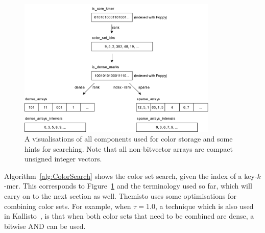 \begin{figure}[t]
  \centering
  \includegraphics[width=0.85\textwidth]{images/ColorComponents.png}
  \caption{A visualisations of all components used for color storage and some hints for searching. Note that all non-bitvector arrays are compact unsigned integer vectors.}\label{fig:ColorComponents}
\end{figure}

Algorithm~\ref{alg:ColorSearch} shows the color set search, given the index of a key-$k$-mer.
This corresponds to Figure~\ref{fig:ColorComponents} and the terminology used so far, which will carry on to the next section as well.
Themisto uses some optimisations for combining color sets.
For example, when $\tau=1.0$, a technique which is also used in Kallisto~\cite{Kallisto}, is that when both color sets that need to be combined are dense, a bitwise AND can be used.

